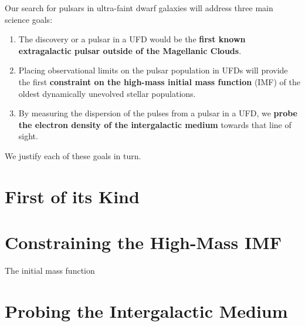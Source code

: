 Our search for pulsars in ultra-faint dwarf galaxies will address three main science goals:
\begin{enumerate}
\item The discovery or a pulsar in a UFD would be the \textbf{first known extragalactic pulsar outside of the Magellanic Clouds}.
\item Placing observational limits on the pulsar population in UFDs will provide the first \textbf{constraint on the high-mass initial mass function} (IMF) of the oldest dynamically unevolved stellar populations.
\item By measuring the dispersion of the pulses from a pulsar in a UFD, we \textbf{probe the electron density of the intergalactic medium} towards that line of sight.
\end{enumerate}
We justify each of these goals in turn.

\section{First of its Kind}


\section{Constraining the High-Mass IMF}
The initial mass function


\section{Probing the Intergalactic Medium}

